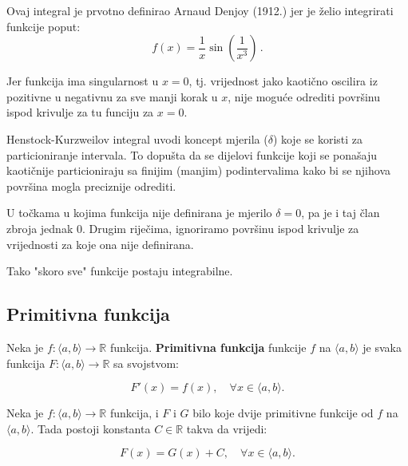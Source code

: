 \begin{multicols}{2}

\noindent
Ovaj integral je prvotno definirao Arnaud Denjoy (1912.) jer je želio integrirati funkcije poput:
$$
    f(x) = \frac{1}{x} \sin \left( \frac{1}{x^3} \right)\,.
$$

Jer funkcija ima singularnost u $x=0$, tj. vrijednost jako kaotično oscilira iz
pozitivne u negativnu za sve manji korak u $x$, nije moguće odrediti površinu
ispod krivulje za tu funciju za $x=0$.

Henstock-Kurzweilov integral uvodi koncept mjerila ($\delta$) koje se koristi za
particioniranje intervala. To dopušta da se dijelovi funkcije koji se ponašaju
kaotičnije particioniraju sa finijim (manjim) podintervalima kako bi se njihova
površina mogla preciznije odrediti.

U točkama u kojima funkcija nije definirana je mjerilo $\delta = 0$, pa je i
taj član zbroja jednak $0$. Drugim riječima, ignoriramo površinu ispod krivulje
za vrijednosti za koje ona nije definirana.

Tako "skoro sve" funkcije postaju integrabilne.

\columnbreak


\end{multicols}

\pagebreak

\subsection{Primitivna funkcija}
Neka je $f: \langle a, b \rangle \to \mathbb{R}$ funkcija.
\textbf{Primitivna funkcija} funkcije $f$ na $\langle a, b \rangle$ je svaka
funkcija $F: \langle a, b \rangle \to \mathbb{R}$ sa svojstvom:

$$
F'(x) = f(x),\quad\forall x \in \langle a, b \rangle.
$$

\begin{theorem}
    Neka je $f: \langle a, b \rangle \to \mathbb{R}$ funkcija, i $F$ i $G$
    bilo koje dvije primitivne funkcije od $f$ na $\langle a, b \rangle$. Tada
    postoji konstanta $C\in\mathbb{R}$ takva da vrijedi:

    $$
    F(x) = G(x) + C,\quad\forall x \in \langle a, b \rangle.
    $$
\end{theorem}

